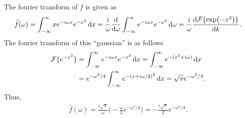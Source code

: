 
The fourier transform of $f$ is given as
\begin{eqnarray}
    \label{eq:fourier-trans-f}
    \widehat{f}(\omega) = \int_{-\infty}^{\infty} xe^{-i\omega x} e^{-x^2} \dd{x} = \frac{i}{\omega} \dv{\omega} \int_{-\infty}^{\infty} e^{-i\omega x} e^{-x^2} \dd{\omega} = \frac{i}{\omega}\dv{\mathcal{F}\{\exp(-x^2)\}}{k}
.\end{eqnarray}
The fourier transform of this ``gaussian'' is as follows
\begin{align}
    \label{eq:fourier-trans-gauss}
    \mathcal{F}\{ e^{-x^2} \} &= \int_{-\infty}^{\infty} e^{-i\omega x} e^{-x^2} \dd{x} = \int_{-\infty}^{\infty} e^{-(x^2 + i\omega)} \dd{x} \notag \\
                              &= e^{-\omega^2/4} \int_{-\infty}^{\infty} e^{-(x + i\omega/2)^2} \dd{x} = \sqrt{\pi} e^{-\omega^2/4}
.\end{align}
Thus,
\begin{eqnarray}
    \label{eq:fourier-deriv}
    \widehat{f}(\omega) = \frac{i\sqrt{\pi}}{\omega} \Big( -\frac{\omega}{2} e^{-\omega^2/4} \Big) = -\frac{i\sqrt{\pi}}{2} e^{-\omega^2/4}
.\end{eqnarray}









